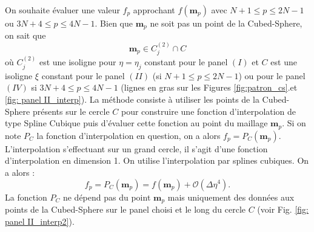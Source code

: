 On souhaite évaluer une valeur $f_p$ approchant $f(\mathbf{m}_p)$ avec $N+1 \leq p \leq 2N-1$ ou $3N+4 \leq p \leq 4N-1$. Bien que $\mathbf{m}_p$ ne soit pas un point de la Cubed-Sphere, on sait que 
\begin{equation}
\mathbf{m}_p \in C^{(2)}_j \cap C
\end{equation} 
où $C^{(2)}_j$ est une isoligne pour $\eta = \eta_j$ constant pour le panel $(I)$ et $C$ est une isoligne $\xi$ constant pour le panel $(II)$ (si $N+1 \leq p \leq 2N-1$) ou pour le panel $(IV)$ si $3N+4 \leq p \leq 4N-1$ (lignes en gras sur les Figures \ref{fig:patron_cs}.et \ref{fig: panel II_interp}).
La méthode consiste à utiliser les points de la Cubed-Sphere présents sur le cercle $C$ pour construire une fonction d'interpolation de type Spline Cubique puis d'évaluer cette fonction au point du maillage $\mathbf{m}_p$. Si on note $P_C$ la fonction d'interpolation en question, on a alors $f_p = P_C (\mathbf{m}_p)$. L'interpolation s'effectuant sur un grand cercle, il s'agit d'une fonction d'interpolation en dimension 1. On utilise l'interpolation par splines cubiques. On a alors \cite{Ahlberg2016} :
\begin{equation}
f_p = P_C(\mathbf{m}_p) = f(\mathbf{m}_p) + \mathcal{O}(\Delta \eta^4).
\end{equation}
La fonction $P_C$ ne dépend pas du point $\mathbf{m}_p$ mais uniquement des données aux points de la Cubed-Sphere sur le panel choisi et le long du cercle $C$ (voir Fig. \ref{fig: panel II_interp2}).

